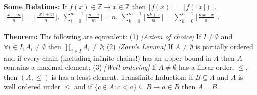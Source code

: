 {\bf Some Relations:}
If $f(x) \in {\mathbb Z} \rightarrow x \in {\mathbb Z}$ then
$\lfloor f(x) \rfloor = \lfloor f(\lfloor x \rfloor) \rfloor$.
$\lfloor {\frac {x+m} n} \rfloor=
\lfloor {\frac {\lfloor x \rfloor + m} n} \rfloor$.
$\sum_{i=0}^{m-1} \lceil {\frac {n-i} m} \rceil= n$.
$ \sum_{k=0}^{m-1} \lfloor {\frac {nk+x} m} \rfloor=
\sum_{k=0}^{n-1} \lfloor {\frac {mk+x} n} \rfloor$.
\\
\\
{\bf Theorem:}
The following are equivalent: (1) \emph{[Axiom of choice]}  If $I \ne \emptyset$ and
$\forall i \in I, A_i \ne \emptyset$ then $\prod_{i \in I} A_i \ne \emptyset$;
(2) \emph{[Zorn's Lemma]} If $A \ne \emptyset$ is partially ordered and if every chain
(including infinite chains!) has an upper bound in $A$ then $A$ contains a
maximal element; (3) \emph{[Well ordering]}  If $A \ne \emptyset$ has a linear order,
$\le$, then $(A, \le)$ is has a least element.  Transfinite Induction: if
$B \subseteq A$ and $A$ is well ordered under $\le$ and if 
$\{ c \in A: c<a \} \subseteq B \rightarrow a \in B$ then $A=B$.
